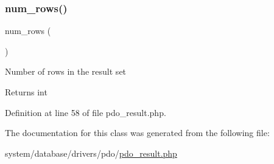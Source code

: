 \subsubsection{\texorpdfstring{num\_rows()}{num\_rows()}}
{\footnotesize\ttfamily num\+\_\+rows (\begin{DoxyParamCaption}{ }\end{DoxyParamCaption})}

Number of rows in the result set

\begin{DoxyReturn}{Returns}
int 
\end{DoxyReturn}


Definition at line 58 of file pdo\+\_\+result.\+php.



The documentation for this class was generated from the following file\+:\begin{DoxyCompactItemize}
\item 
system/database/drivers/pdo/\mbox{\hyperlink{pdo__result_8php}{pdo\+\_\+result.\+php}}\end{DoxyCompactItemize}
